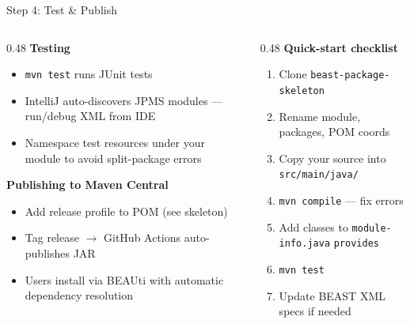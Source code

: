 \documentclass[aspectratio=169,11pt]{beamer}
\newcommand{\code}[1]{\texttt{#1}}
\begin{document}

\begin{frame}{Step 4: Test \& Publish}
\begin{columns}[T]
\begin{column}{0.48\textwidth}
\textbf{Testing}
\begin{itemize}
\item \code{mvn test} runs JUnit tests
\item IntelliJ auto-discovers JPMS modules --- run/debug XML from IDE
\item Namespace test resources under your module to avoid split-package errors
\end{itemize}

\vspace{0.5em}
\textbf{Publishing to Maven Central}
\begin{itemize}
\item Add release profile to POM (see skeleton)
\item Tag release $\to$ GitHub Actions auto-publishes JAR
\item Users install via BEAUti with automatic dependency resolution
\end{itemize}
\end{column}
\begin{column}{0.48\textwidth}
\textbf{Quick-start checklist}
\begin{enumerate}
\item Clone \code{beast-package-skeleton}
\item Rename module, packages, POM coords
\item Copy your source into \code{src/main/java/}
\item \code{mvn compile} --- fix errors
\item Add classes to \code{module-info.java} \code{provides}
\item \code{mvn test}
\item Update BEAST XML specs if needed
\end{enumerate}
\end{column}
\end{columns}
\end{frame}

\end{document}
